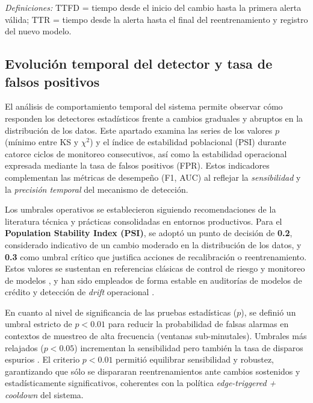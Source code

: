 \noindent\footnotesize\emph{Definiciones:} TTFD = tiempo desde el inicio del cambio hasta la primera alerta válida; 
TTR = tiempo desde la alerta hasta el final del reentrenamiento y registro del nuevo modelo.
\normalsize

\subsection{Evolución temporal del detector y tasa de falsos positivos}
\label{subsec:psi-series}

El análisis de comportamiento temporal del sistema permite observar cómo responden los detectores estadísticos frente a cambios graduales y abruptos en la distribución de los datos. 
Este apartado examina las series de los valores $p$ (mínimo entre KS y $\chi^2$) y el índice de estabilidad poblacional (PSI) durante catorce ciclos de monitoreo consecutivos, así como la estabilidad operacional expresada mediante la tasa de falsos positivos (FPR). 
Estos indicadores complementan las métricas de desempeño (F1, AUC) al reflejar la \textit{sensibilidad} y la \textit{precisión temporal} del mecanismo de detección.

Los umbrales operativos se establecieron siguiendo recomendaciones de la literatura técnica y prácticas consolidadas en entornos productivos. 
Para el \textbf{Population Stability Index (PSI)}, se adoptó un punto de decisión de \textbf{0.2}, considerado indicativo de un cambio moderado en la distribución de los datos, y \textbf{0.3} como umbral crítico que justifica acciones de recalibración o reentrenamiento. 
Estos valores se sustentan en referencias clásicas de control de riesgo y monitoreo de modelos \citep{Siddiqi2012,Chawla2021,Nguyen2023}, y han sido empleados de forma estable en auditorías de modelos de crédito y detección de \textit{drift} operacional \citep{DeSousa2023}. 

En cuanto al nivel de significancia de las pruebas estadísticas ($p$), se definió un umbral estricto de \textbf{$p<0.01$} para reducir la probabilidad de falsas alarmas en contextos de muestreo de alta frecuencia (ventanas sub-minutales). 
Umbrales más relajados ($p<0.05$) incrementan la sensibilidad pero también la tasa de disparos espurios \citep{Sethi2017}. 
El criterio $p<0.01$ permitió equilibrar sensibilidad y robustez, garantizando que sólo se dispararan reentrenamientos ante cambios sostenidos y estadísticamente significativos, coherentes con la política \textit{edge-triggered + cooldown} del sistema.

